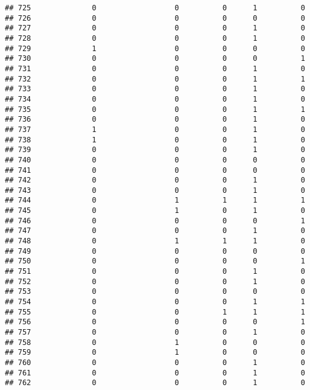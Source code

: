 \documentclass[
]{article}
\begin{document}
\begin{verbatim}
## 725              0                  0          0      1          0
## 726              0                  0          0      0          0
## 727              0                  0          0      1          0
## 728              0                  0          0      1          0
## 729              1                  0          0      0          0
## 730              0                  0          0      0          1
## 731              0                  0          0      1          0
## 732              0                  0          0      1          1
## 733              0                  0          0      1          0
## 734              0                  0          0      1          0
## 735              0                  0          0      1          1
## 736              0                  0          0      1          0
## 737              1                  0          0      1          0
## 738              1                  0          0      1          0
## 739              0                  0          0      1          0
## 740              0                  0          0      0          0
## 741              0                  0          0      0          0
## 742              0                  0          0      1          0
## 743              0                  0          0      1          0
## 744              0                  1          1      1          1
## 745              0                  1          0      1          0
## 746              0                  0          0      0          1
## 747              0                  0          0      1          0
## 748              0                  1          1      1          0
## 749              0                  0          0      0          0
## 750              0                  0          0      0          1
## 751              0                  0          0      1          0
## 752              0                  0          0      1          0
## 753              0                  0          0      0          0
## 754              0                  0          0      1          1
## 755              0                  0          1      1          1
## 756              0                  0          0      0          1
## 757              0                  0          0      1          0
## 758              0                  1          0      0          0
## 759              0                  1          0      0          0
## 760              0                  0          0      1          0
## 761              0                  0          0      1          0
## 762              0                  0          0      1          0

\end{verbatim}
\end{document}
